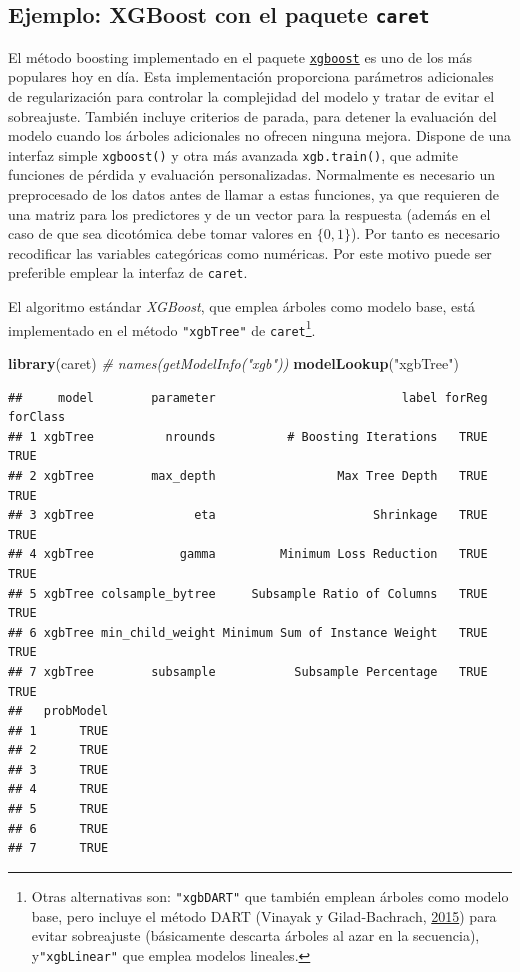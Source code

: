 \documentclass[
  spanish,
]{book}
\newenvironment{Shaded}{\begin{snugshade}}{\end{snugshade}}
\newcommand{\CommentTok}[1]{\textcolor[rgb]{0.56,0.35,0.01}{\textit{#1}}}
\newcommand{\KeywordTok}[1]{\textcolor[rgb]{0.13,0.29,0.53}{\textbf{#1}}}
\newcommand{\NormalTok}[1]{#1}
\newcommand{\StringTok}[1]{\textcolor[rgb]{0.31,0.60,0.02}{#1}}
\theoremstyle{break}
\theoremstyle{definition}
\theoremstyle{definition}
\theoremstyle{definition}
\theoremstyle{remark}
\begin{document}
\hypertarget{ejemplo-xgboost-con-el-paquete-caret}{%
\subsection{\texorpdfstring{Ejemplo: XGBoost con el paquete \texttt{caret}}{Ejemplo: XGBoost con el paquete caret}}\label{ejemplo-xgboost-con-el-paquete-caret}}

El método boosting implementado en el paquete \href{https://github.com/dmlc/xgboost/tree/master/R-package}{\texttt{xgboost}} es uno de los más populares hoy en día.
Esta implementación proporciona parámetros adicionales de regularización para controlar la complejidad del modelo y tratar de evitar el sobreajuste.
También incluye criterios de parada, para detener la evaluación del modelo cuando los árboles adicionales no ofrecen ninguna mejora.
Dispone de una interfaz simple \texttt{xgboost()} y otra más avanzada \texttt{xgb.train()}, que admite funciones de pérdida y evaluación personalizadas.
Normalmente es necesario un preprocesado de los datos antes de llamar a estas funciones, ya que requieren de una matriz para los predictores y de un vector para la respuesta (además en el caso de que sea dicotómica debe tomar valores en \(\{0, 1\}\)). Por tanto es necesario recodificar las variables categóricas como numéricas.
Por este motivo puede ser preferible emplear la interfaz de \texttt{caret}.

El algoritmo estándar \emph{XGBoost}, que emplea árboles como modelo base, está implementado en el método \texttt{"xgbTree"} de \texttt{caret}\footnote{Otras alternativas son: \texttt{"xgbDART"} que también emplean árboles como modelo base, pero incluye el método DART (Vinayak y Gilad-Bachrach, \protect\hyperlink{ref-vinayak2015dart}{2015}) para evitar sobreajuste (básicamente descarta árboles al azar en la secuencia), y\texttt{"xgbLinear"} que emplea modelos lineales.}.

\begin{Shaded}
\begin{Highlighting}[]
\KeywordTok{library}\NormalTok{(caret)}
\CommentTok{# names(getModelInfo("xgb"))}
\KeywordTok{modelLookup}\NormalTok{(}\StringTok{"xgbTree"}\NormalTok{)}
\end{Highlighting}
\end{Shaded}

\begin{verbatim}
##     model        parameter                          label forReg forClass
## 1 xgbTree          nrounds          # Boosting Iterations   TRUE     TRUE
## 2 xgbTree        max_depth                 Max Tree Depth   TRUE     TRUE
## 3 xgbTree              eta                      Shrinkage   TRUE     TRUE
## 4 xgbTree            gamma         Minimum Loss Reduction   TRUE     TRUE
## 5 xgbTree colsample_bytree     Subsample Ratio of Columns   TRUE     TRUE
## 6 xgbTree min_child_weight Minimum Sum of Instance Weight   TRUE     TRUE
## 7 xgbTree        subsample           Subsample Percentage   TRUE     TRUE
##   probModel
## 1      TRUE
## 2      TRUE
## 3      TRUE
## 4      TRUE
## 5      TRUE
## 6      TRUE
## 7      TRUE
\end{verbatim}
\end{document}
